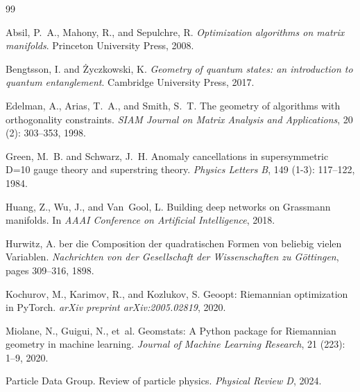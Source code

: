 \documentclass[11pt,a4paper]{article}
\begin{document}


\begin{thebibliography}{99}

Absil, P.~A., Mahony, R., and Sepulchre, R.
\newblock \emph{Optimization algorithms on matrix manifolds}.
\newblock Princeton University Press, 2008.

Bengtsson, I. and {\.Z}yczkowski, K.
\newblock \emph{Geometry of quantum states: an introduction to quantum entanglement}.
\newblock Cambridge University Press, 2017.

Edelman, A., Arias, T.~A., and Smith, S.~T.
\newblock The geometry of algorithms with orthogonality constraints.
\newblock \emph{SIAM Journal on Matrix Analysis and Applications}, 20 (2): 303--353, 1998.

Green, M.~B. and Schwarz, J.~H.
\newblock Anomaly cancellations in supersymmetric D=10 gauge theory and superstring theory.
\newblock \emph{Physics Letters B}, 149 (1-3): 117--122, 1984.

Huang, Z., Wu, J., and Van~Gool, L.
\newblock Building deep networks on Grassmann manifolds.
\newblock In \emph{AAAI Conference on Artificial Intelligence}, 2018.

Hurwitz, A.
ber die Composition der quadratischen Formen von beliebig vielen Variablen.
\newblock \emph{Nachrichten von der Gesellschaft der Wissenschaften zu G{\"o}ttingen}, pages 309--316, 1898.

Kochurov, M., Karimov, R., and Kozlukov, S.
\newblock Geoopt: Riemannian optimization in PyTorch.
\newblock \emph{arXiv preprint arXiv:2005.02819}, 2020.

Miolane, N., Guigui, N., et~al.
\newblock Geomstats: A Python package for Riemannian geometry in machine learning.
\newblock \emph{Journal of Machine Learning Research}, 21 (223): 1--9, 2020.

Particle Data Group.
\newblock Review of particle physics.
\newblock \emph{Physical Review D}, 2024.


\end{thebibliography}
\end{document}
